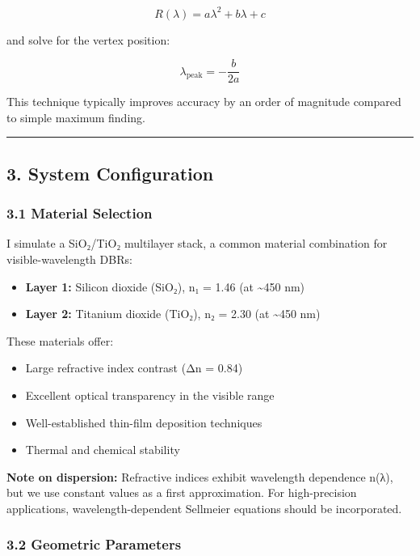 \documentclass[
]{article}
\providecommand{\tightlist}{%
  \setlength{\itemsep}{0pt}\setlength{\parskip}{0pt}}
\begin{document}
\[R(\lambda) = a\lambda^2 + b\lambda + c\]

and solve for the vertex position:

\[\lambda_{\text{peak}} = -\frac{b}{2a}\]

This technique typically improves accuracy by an order of magnitude
compared to simple maximum finding.

\begin{center}\rule{0.5\linewidth}{0.5pt}\end{center}

\subsection{3. System Configuration}\label{system-configuration}

\subsubsection{3.1 Material Selection}\label{material-selection}

I simulate a SiO₂/TiO₂ multilayer stack, a common material combination
for visible-wavelength DBRs:

\begin{itemize}
\tightlist
\item
  \textbf{Layer 1:} Silicon dioxide (SiO₂), n₁ = 1.46 (at
  \textasciitilde450 nm)
\item
  \textbf{Layer 2:} Titanium dioxide (TiO₂), n₂ = 2.30 (at
  \textasciitilde450 nm)
\end{itemize}

These materials offer:

\begin{itemize}
\tightlist
\item
  Large refractive index contrast (Δn = 0.84)
\item
  Excellent optical transparency in the visible range
\item
  Well-established thin-film deposition techniques
\item
  Thermal and chemical stability
\end{itemize}

\textbf{Note on dispersion:} Refractive indices exhibit wavelength
dependence n(λ), but we use constant values as a first approximation.
For high-precision applications, wavelength-dependent Sellmeier
equations should be incorporated.

\subsubsection{3.2 Geometric Parameters}\label{geometric-parameters}
\end{document}
